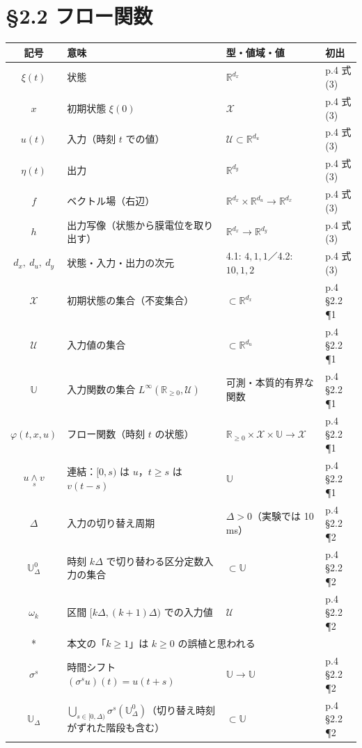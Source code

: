 \documentclass[a4paper,10pt]{ltjsarticle}
\newcommand{\cat}[2]{u\mathbin{\underset{#1}{\wedge}}#2}
\newcommand{\note}[1]{\textcolor{red!70!black}{#1}}
\newenvironment{symtab}{%
  \par\noindent\begin{tabular}{SMTP}
  \toprule
  記号 & 意味 & 型・値域・値 & 初出 \\
  \midrule
}{\bottomrule\end{tabular}\par\medskip}
\begin{document}
\section{§2.2 フロー関数}
\begin{symtab}
$\xi(t)$ & 状態 & $\mathbb{R}^{d_x}$ & p.4 式(3) \\
$x$ & 初期状態 $\xi(0)$ & $\mathcal{X}$ & p.4 式(3) \\
$u(t)$ & 入力（時刻 $t$ での値） & $\mathcal{U}\subset\mathbb{R}^{d_u}$ & p.4 式(3) \\
$\eta(t)$ & 出力 & $\mathbb{R}^{d_y}$ & p.4 式(3) \\
$f$ & ベクトル場（右辺） & $\mathbb{R}^{d_x}\times\mathbb{R}^{d_u}\to\mathbb{R}^{d_x}$ & p.4 式(3) \\
$h$ & 出力写像（状態から膜電位を取り出す） & $\mathbb{R}^{d_x}\to\mathbb{R}^{d_y}$ & p.4 式(3) \\
$d_x,\ d_u,\ d_y$ & 状態・入力・出力の次元 & 4.1: $4,1,1$／4.2: $10,1,2$ & p.4 式(3) \\
$\mathcal{X}$ & 初期状態の集合（不変集合） & $\subset\mathbb{R}^{d_x}$ & p.4 §2.2 ¶1 \\
$\mathcal{U}$ & 入力値の集合 & $\subset\mathbb{R}^{d_u}$ & p.4 §2.2 ¶1 \\
$\mathbb{U}$ & 入力関数の集合 $L^\infty(\mathbb{R}_{\ge0},\mathcal{U})$ & 可測・本質的有界な関数 & p.4 §2.2 ¶1 \\
$\varphi(t,x,u)$ & フロー関数（時刻 $t$ の状態） & $\mathbb{R}_{\ge0}\times\mathcal{X}\times\mathbb{U}\to\mathcal{X}$ & p.4 §2.2 ¶1 \\
$\cat{s}{v}$ & 連結：$[0,s)$ は $u$，$t\ge s$ は $v(t-s)$ & $\mathbb{U}$ & p.4 §2.2 ¶1 \\
$\Delta$ & 入力の切り替え周期 & $\Delta>0$（実験では 10\,ms） & p.4 §2.2 ¶2 \\
$\mathbb{U}^0_\Delta$ & 時刻 $k\Delta$ で切り替わる区分定数入力の集合 & $\subset\mathbb{U}$ & p.4 §2.2 ¶2 \\
$\omega_k$ & 区間 $[k\Delta,(k+1)\Delta)$ での入力値 & $\mathcal{U}$ & p.4 §2.2 ¶2 \\*
& \multicolumn{3}{l}{\note{本文の「$k\ge1$」は $k\ge 0$ の誤植と思われる}} \\
$\sigma^s$ & 時間シフト $(\sigma^s u)(t)=u(t+s)$ & $\mathbb{U}\to\mathbb{U}$ & p.4 §2.2 ¶2 \\
$\mathbb{U}_\Delta$ & $\bigcup_{s\in[0,\Delta)}\sigma^s(\mathbb{U}^0_\Delta)$（切り替え時刻がずれた階段も含む） & $\subset\mathbb{U}$ & p.4 §2.2 ¶2 \\
\end{symtab}
\end{document}
